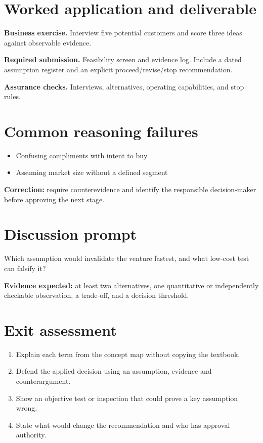 \documentclass[11pt,letterpaper]{article}
\begin{document}
\section{Worked application and deliverable}
\textbf{Business exercise.} Interview five potential customers and score three ideas against observable evidence.\par\textbf{Required submission.} Feasibility screen and evidence log. Include a dated assumption register and an explicit proceed/revise/stop recommendation.\par\textbf{Assurance checks.} Interviews, alternatives, operating capabilities, and stop rules.
\section{Common reasoning failures}
\begin{itemize}[leftmargin=*,itemsep=3pt]
\item Confusing compliments with intent to buy
\item Assuming market size without a defined segment
\end{itemize}
\noindent\textbf{Correction:} require counterevidence and identify the responsible decision-maker before approving the next stage.
\section{Discussion prompt}
Which assumption would invalidate the venture fastest, and what low-cost test can falsify it?\par\medskip\textbf{Evidence expected:} at least two alternatives, one quantitative or independently checkable observation, a trade-off, and a decision threshold.
\section{Exit assessment}
\begin{enumerate}[leftmargin=*,itemsep=5pt]
\item Explain each term from the concept map without copying the textbook.
\item Defend the applied decision using an assumption, evidence and counterargument.
\item Show an objective test or inspection that could prove a key assumption wrong.
\item State what would change the recommendation and who has approval authority.
\end{enumerate}

\end{document}
